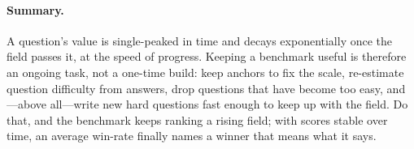 \documentclass[11pt]{article}
\theoremstyle{plain}
\theoremstyle{definition}
\theoremstyle{remark}
\begin{document}
\paragraph{Summary.} A question's value is single-peaked in time and decays
exponentially once the field passes it, at the speed of progress. Keeping a benchmark
useful is therefore an ongoing task, not a one-time build: keep anchors to fix the
scale, re-estimate question difficulty from answers, drop questions that have become
too easy, and---above all---write new hard questions fast enough to keep up with the
field. Do that, and the benchmark keeps ranking a rising field; with scores stable
over time, an average win-rate finally names a winner that means what it says.
\end{document}

